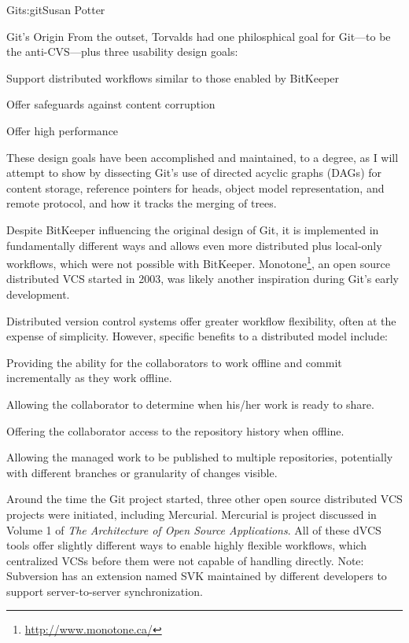 \begin{aosachapter}{Git}{s:git}{Susan Potter}
\begin{aosasect1}{Git's Origin}
From the outset, Torvalds had one philosphical goal for Git---to be the anti-CVS---plus
three usability design goals:

\begin{aosaitemize}
  \item Support distributed workflows similar to those enabled by BitKeeper
  \item Offer safeguards against content corruption
  \item Offer high performance
\end{aosaitemize}

These design goals have been accomplished and maintained, to a degree, as I
will attempt to show by dissecting Git's use of directed acyclic graphs
(DAGs) for content storage, reference pointers for heads, object model
representation, and remote protocol, and how it tracks the merging of trees.

Despite BitKeeper influencing the original design of Git, it is implemented
in fundamentally different ways and allows even more distributed plus
local-only workflows, which were not possible with BitKeeper. 
Monotone\footnote{\url{http://www.monotone.ca/}},
an open source distributed VCS started in 2003, was likely another
inspiration during Git's early development.

Distributed version control systems offer greater workflow flexibility, often
at the expense of simplicity. However, specific benefits to a distributed
model include:
\begin{aosaitemize}
  \item Providing the ability for the collaborators to work offline and
  commit incrementally as they work offline.
  \item Allowing the collaborator to determine when his/her work is
  ready to share.
  \item Offering the collaborator access to the repository history when
  offline.
  \item Allowing the managed work to be published to multiple repositories,
  potentially with different branches or granularity of changes visible.
\end{aosaitemize}

Around the time the Git project started, three other open source
distributed VCS projects were initiated, including Mercurial. Mercurial is 
project discussed in Volume 1 of \emph{The Architecture of Open Source Applications}. All of these dVCS tools
offer slightly different ways to enable highly flexible workflows, which
centralized VCSs before them were not capable of handling directly.
Note: Subversion has an extension named SVK maintained by different developers
to support server-to-server synchronization.


\end{aosasect1}
\end{aosachapter}
